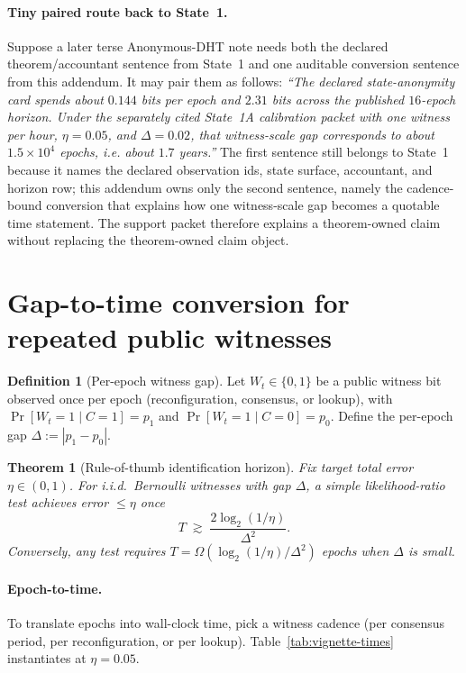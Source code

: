 \documentclass[11pt]{article}
\newtheorem{theorem}{Theorem}
\theoremstyle{definition}
\newtheorem{definition}{Definition}
\theoremstyle{remark}
\begin{document}
\paragraph{Tiny paired route back to State~1.}
Suppose a later terse Anonymous-DHT note needs both the declared theorem/accountant sentence from State~1 and one auditable conversion sentence from this addendum.
It may pair them as follows: \emph{``The declared state-anonymity card spends about $0.144$ bits per epoch and $2.31$ bits across the published $16$-epoch horizon. Under the separately cited State~1A calibration packet with one witness per hour, $\eta=0.05$, and $\Delta=0.02$, that witness-scale gap corresponds to about $1.5\times 10^{4}$ epochs, i.e. about $1.7$ years.''}
The first sentence still belongs to State~1 because it names the declared observation ids, state surface, accountant, and horizon row; this addendum owns only the second sentence, namely the cadence-bound conversion that explains how one witness-scale gap becomes a quotable time statement. The support packet therefore explains a theorem-owned claim without replacing the theorem-owned claim object.\cite{series:state1}

\section{Gap-to-time conversion for repeated public witnesses}

\begin{definition}[Per-epoch witness gap]
Let $W_t\in\{0,1\}$ be a public witness bit observed once per epoch (reconfiguration, consensus, or lookup),
with $\Pr[W_t=1\mid C=1]=p_1$ and $\Pr[W_t=1\mid C=0]=p_0$.
Define the per-epoch gap $\Delta := |p_1-p_0|$.
\end{definition}

\begin{theorem}[Rule-of-thumb identification horizon]\label{thm:repeat-witness}
Fix target total error $\eta\in(0,1)$.
For i.i.d.\ Bernoulli witnesses with gap $\Delta$, a simple likelihood-ratio test achieves error $\le \eta$ once
\[
T \;\gtrsim\; \frac{2\log_2(1/\eta)}{\Delta^2}.
\]
Conversely, any test requires $T=\Omega(\log_2(1/\eta)/\Delta^2)$ epochs when $\Delta$ is small.
\end{theorem}

\paragraph{Epoch-to-time.}
To translate epochs into wall-clock time, pick a witness cadence (per consensus period, per reconfiguration, or per lookup).
Table~\ref{tab:vignette-times} instantiates  at $\eta=0.05$.
\end{document}

